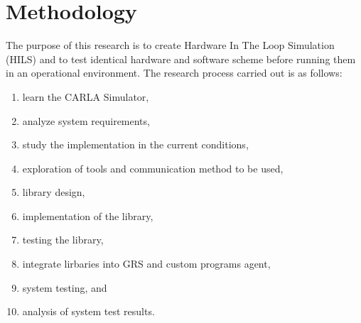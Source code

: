 \section{Methodology}

The purpose of this research is to create Hardware In The Loop Simulation (HILS)
and to test identical hardware and software scheme before running them in an
operational environment. The research process carried out is as follows:
\begin{enumerate}
	\item learn the CARLA Simulator,
	\item analyze system requirements,
	\item study the implementation in the current conditions,
	\item exploration of tools and communication method to be used,
	\item library design,
	\item implementation of the library,
	\item testing the library,
	\item integrate lirbaries into GRS and custom programs agent,
	\item system testing, and
	\item analysis of system test results.
\end{enumerate}
